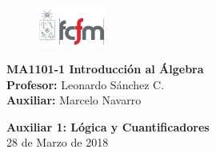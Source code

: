 \documentclass[letterpaper,11pt]{article}
\theoremstyle{plain}
\begin{document}
\newpage
\pagestyle{fancy}
\fancyhf{}

\begin{figure} %
    \vspace{-5mm}
    \includegraphics[width=0.2\textwidth]{img/fcfm2.png}
\end{figure}


\noindent
\textbf{MA1101-1 Introducción al Álgebra}\\
\textbf{Profesor: }Leonardo Sánchez C.\\
\textbf{Auxiliar: }Marcelo Navarro

\begin{center}
{\bf \Large Auxiliar 1: Lógica y Cuantificadores}\\
{28 de Marzo de 2018}
\end{center}
\end{document}
